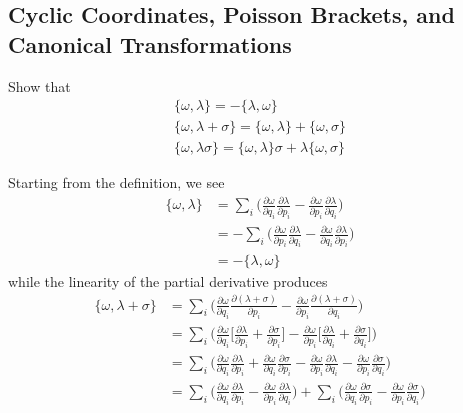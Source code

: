 \documentclass[../principles-of-quantum-mechanics.tex]{subfiles}
\begin{document}
\begin{questions}
		\setcounter{subsection}{6}
		\setcounter{question}{0}
		\subsection{Cyclic Coordinates, Poisson Brackets, and Canonical Transformations}
		\question Show that
		\begin{gather*}
			\{\omega, \lambda\} = -\{\lambda, \omega\} \\
			\{\omega, \lambda + \sigma\} = \{\omega, \lambda\} + \{\omega, \sigma\} \\
			\{\omega, \lambda\sigma\} = \{\omega, \lambda\}\sigma + \lambda\{\omega, \sigma\}
		\end{gather*}
		
		\begin{solution}
			Starting from the definition, we see
			\begin{align*}
				\{\omega, \lambda\} &= \sum_i\Big(\frac{\partial\omega}{\partial q_i}\frac{\partial\lambda}{\partial p_i} - \frac{\partial\omega}{\partial p_i}\frac{\partial\lambda}{\partial q_i}\Big) \\
				&= -\sum_i\Big(\frac{\partial\omega}{\partial p_i}\frac{\partial\lambda}{\partial q_i} - \frac{\partial\omega}{\partial q_i}\frac{\partial\lambda}{\partial p_i}\Big) \\
				&= -\{\lambda, \omega\}
			\end{align*}
			while the linearity of the partial derivative produces
			\begin{align*}
				\{\omega, \lambda + \sigma\} &= \sum_i\Big(\frac{\partial\omega}{\partial q_i}\frac{\partial(\lambda + \sigma)}{\partial p_i} - \frac{\partial\omega}{\partial p_i}\frac{\partial(\lambda + \sigma)}{\partial q_i}\Big) \\
				&= \sum_i\Big(\frac{\partial\omega}{\partial q_i}\Big[\frac{\partial\lambda}{\partial p_i} + \frac{\partial\sigma}{\partial p_i}\Big] - \frac{\partial\omega}{\partial p_i}\Big[\frac{\partial\lambda}{\partial q_i} + \frac{\partial\sigma}{\partial q_i}\Big]\Big) \\
				&= \sum_i\Big(\frac{\partial\omega}{\partial q_i}\frac{\partial\lambda}{\partial p_i} + \frac{\partial\omega}{\partial q_i}\frac{\partial\sigma}{\partial p_i} - \frac{\partial\omega}{\partial p_i}\frac{\partial\lambda}{\partial q_i} - \frac{\partial\omega}{\partial p_i}\frac{\partial\sigma}{\partial q_i}\Big) \\
				&= \sum_i\Big(\frac{\partial\omega}{\partial q_i}\frac{\partial\lambda}{\partial p_i} - \frac{\partial\omega}{\partial p_i}\frac{\partial\lambda}{\partial q_i}\Big) + \sum_i\Big(\frac{\partial\omega}{\partial q_i}\frac{\partial\sigma}{\partial p_i} - \frac{\partial\omega}{\partial p_i}\frac{\partial\sigma}{\partial q_i}\Big) \\

\end{align*}
\end{solution}
\end{questions}
\end{document}
